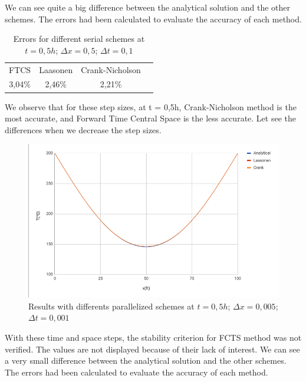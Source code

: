 \documentclass{article}
\begin{document}
                We can see quite a big difference between the analytical solution and the other schemes. The errors had been calculated 
                to evaluate the accuracy of each method.

                \begin{table}[H]
                    \centering
                    \caption{Errors for different serial schemes at $t = 0,5h$; $\Delta x=0,5$; $\Delta t=0,1$}
                    \begin{tabular}{|c|c|c|l}
                    \cline{1-3}
                    FTCS     & Laasonen & Crank-Nicholson &  \\ \cline{1-3}
                    3,04\%   & 2,46\%   & 2,21\%          &  \\ \cline{1-3}
                    \end{tabular}
                    
                \end{table}

                We observe that for these step sizes, at t = 0,5h, Crank-Nicholson method is the 
                most accurate, and Forward Time Central Space is the less accurate. Let see the 
                differences when we decrease the step sizes.

                \begin{figure}[H]
                    \includegraphics[width=\textwidth]{step_size_2.png}
                    \caption{Results with differents parallelized schemes at $t = 0,5h$; $\Delta x=0,005$; $\Delta t=0,001$}
                \end{figure}

                With these time and space steps, the stability criterion for FCTS method was not 
                verified. The values are not displayed because of their lack of interest.
                We can see a very small difference between the analytical solution and the other schemes. The errors had been calculated 
                to evaluate the accuracy of each method.
\end{document}
